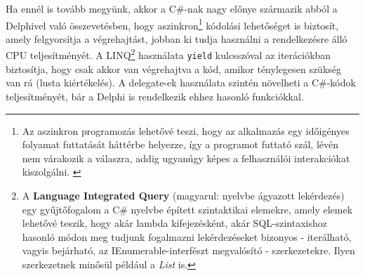 \documentclass[tocnopagenum]{thesis-ekf}
\theoremstyle{definition}
\theoremstyle{remark}
\begin{document}
	Ha ennél is tovább megyünk, akkor a C\#-nak nagy előnye származik abból a Delphivel való összevetésben, hogy aszinkron\footnote{ Az aszinkron programozás lehetővé teszi, hogy az alkalmazás egy időigényes folyamat futtatását háttérbe helyezze, így a programot futtató szál, lévén nem várakozik a válaszra, addig ugyanúgy képes a felhasználói interakciókat kiszolgálni. \cite{async}} kódolási lehetőséget is biztosít, amely felgyorsítja a végrehajtást, jobban ki tudja használni a rendelkezésre álló CPU teljesítményét. A LINQ\footnote{A \textbf{Language Integrated Query} (magyarul: nyelvbe ágyazott lekérdezés) egy gyűjtőfogalom a C\# nyelvbe épített szintaktikai elemekre, amely elemek lehetővé teszik, hogy akár lambda kifejezésként, akár SQL-szintaxishoz hasonló módon meg tudjunk fogalmazni lekérdezéseket bizonyos - iterálható, vagyis bejárható, az IEnumerable-interfészt megvalósító - szerkezetekre. Ilyen szerkezetnek minősül például a \textit{List} is.} használata \verb|yield| kulcsszóval az iterációkban biztosítja, hogy csak akkor van végrehajtva a kód, amikor ténylegesen szükség van rá (lusta kiértékelés). A delegate-ek használata szintén növelheti a C\#-kódok teljesítményét, bár a Delphi is rendelkezik ehhez hasonló funkciókkal.
	\cite{perf_comp}
	
\end{document}
